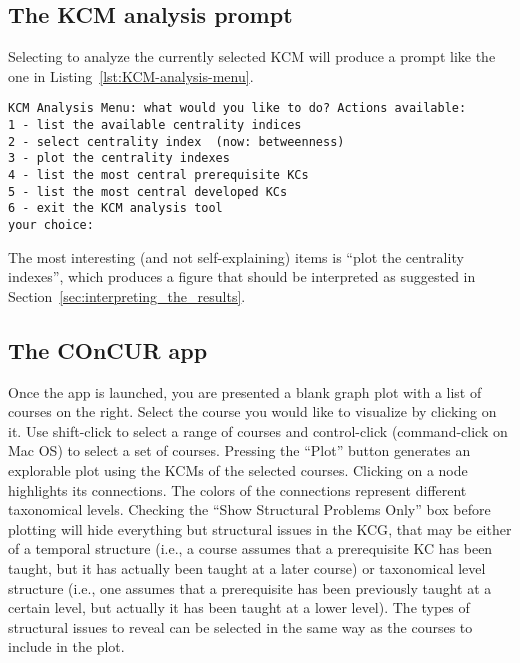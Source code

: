 \subsection{The KCM analysis prompt}
\label{ssec:the_kcm_analysis_prompt}

Selecting to analyze the currently selected KCM will produce a prompt like
the one in Listing~\ref{lst:KCM-analysis-menu}.

\begin{lstlisting}[caption=Menu that one obtains by launching an analysis of the currently selected KCM.,label=lst:KCM-analysis-menu]
KCM Analysis Menu: what would you like to do? Actions available:
1 - list the available centrality indices
2 - select centrality index  (now: betweenness)
3 - plot the centrality indexes
4 - list the most central prerequisite KCs
5 - list the most central developed KCs
6 - exit the KCM analysis tool
your choice: 
\end{lstlisting}

The most interesting (and not self-explaining) items is ``plot the
centrality indexes'', which produces a figure that should be interpreted as
suggested in Section~\ref{sec:interpreting_the_results}.

\subsection{The COnCUR app}
\label{ssec:the_cite_app}

Once the app is launched, you are presented a blank graph plot with a list of
courses on the right. Select the course you would like to visualize by
clicking on it. Use shift-click to select a range of courses and
control-click (command-click on Mac OS) to select a set of courses. Pressing
the ``Plot'' button generates an explorable plot using the \acp{KCM} of the
selected courses. Clicking on a node highlights its connections. The colors
of the connections represent different taxonomical levels. Checking the
``Show Structural Problems Only'' box before plotting will hide everything
but structural issues in the \ac{KCG}, that may be either of a temporal
structure (i.e., a course assumes that a prerequisite \ac{KC} has been
taught, but it has actually been taught at a later course) or taxonomical
level structure (i.e., one assumes that a prerequisite has been previously
taught at a certain level, but actually it has been taught at a lower level).
The types of structural issues to reveal can be selected in the same way as
the courses to include in the plot.
